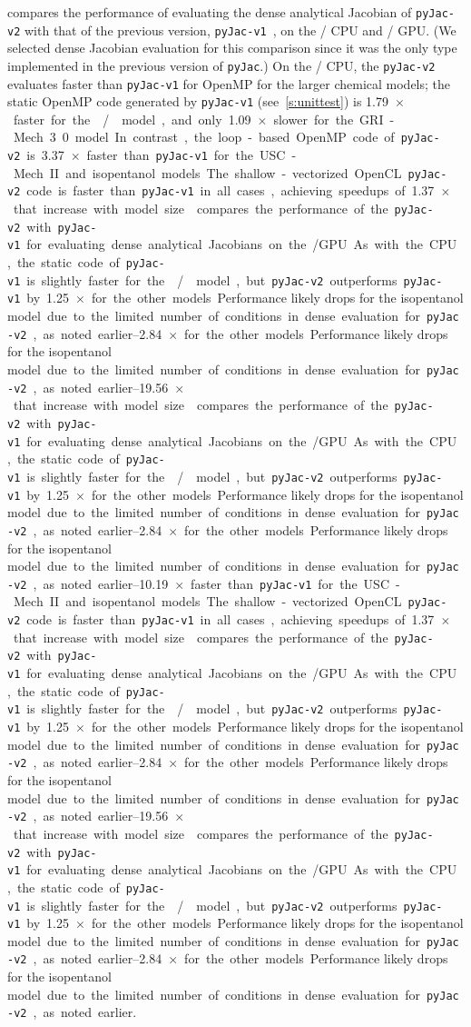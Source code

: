 \documentclass[12pt,number,sort&compress,preprint]{elsarticle}
\newcommand{\revise}[1]{{\sloppy\textcolor{RoyalPurple}{#1}}}  %
\begin{document}
 compares the performance of evaluating the dense analytical Jacobian of \texttt{pyJac-v2} with that of the previous version, \texttt{pyJac-v1}~\cite{pyjac16}, on the \sse/ CPU and \gpuold/ GPU.
(We selected dense Jacobian evaluation for this comparison since it was the only type implemented in the previous version of \texttt{pyJac}.)
On the \sse/ CPU, the \texttt{pyJac-v2} evaluates faster than \texttt{pyJac-v1} for OpenMP for the larger chemical models; the static OpenMP code generated by \texttt{pyJac-v1} (see~\cref{s:unittest}) is \SI{1.79}{$\times$} faster for the \slash{} model, and only \SI{1.09}{$\times$} slower for the GRI-Mech 3.0 model.
In contrast, the loop-based OpenMP code of \texttt{pyJac-v2} is \SIrange{3.37}{10.19}{$\times$} faster than \texttt{pyJac-v1} for the USC-Mech II and isopentanol models.
The shallow-vectorized OpenCL \texttt{pyJac-v2} code is faster than \texttt{pyJac-v1} in all cases, achieving speedups of \SIrange{1.37}{19.56}{$\times$} that increase with model size.
 compares the performance of the \texttt{pyJac-v2} with \texttt{pyJac-v1} for evaluating dense analytical Jacobians on the \gpuold/ GPU.
As with the CPU, the static code of \texttt{pyJac-v1} is slightly faster for the \slash{} model, but \texttt{pyJac-v2} outperforms \texttt{pyJac-v1} by \SIrange{1.25}{2.84}{$\times$} for the other models.
\revise{Performance likely drops for the isopentanol model} due to the limited number of conditions in dense evaluation for \texttt{pyJac-v2}, as noted earlier.
\end{document}
